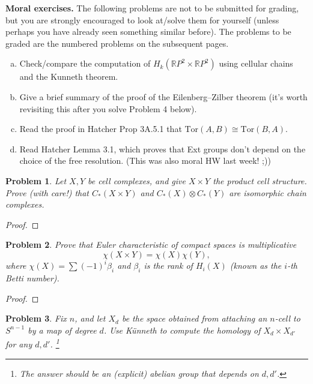 \documentclass[11pt]{article}
\newtheorem{problem}{Problem}
\begin{document}
{\bf Moral exercises.} The following problems are not to be submitted for grading, but you are strongly encouraged to look at/solve them for yourself (unless perhaps you have already seen something similar before). The problems to be graded are the numbered problems on the subsequent pages.
\begin{enumerate}[(a)]
\item Check/compare the computation of $H_k(\mathbb RP^2\times \mathbb RP^2)$ using cellular chains and the Kunneth theorem. 
\item Give a brief summary of the proof of the Eilenberg--Zilber theorem (it's worth revisiting this after you solve Problem 4 below). 
\item Read the proof in Hatcher Prop 3A.5.1 that $\text{Tor}(A,B)\cong\text{Tor}(B,A)$. 
\item Read Hatcher Lemma 3.1, which proves that Ext groups don't depend on the choice of the free resolution. (This was also moral HW last week! ;))
\end{enumerate}


\pagebreak 


\begin{problem}
Let $X,Y$ be cell complexes, and give $X\times Y$ the product cell structure. Prove (with care!) that $C_*(X\times Y)$ and $C_*(X)\otimes C_*(Y)$ are isomorphic chain complexes. 
\end{problem}

\begin{proof}

\end{proof}

\pagebreak 

\begin{problem}
Prove that Euler characteristic of compact spaces is multiplicative 
\[\chi(X\times Y)=\chi(X)\chi(Y),\] where $\chi(X)=\sum(-1)^i\beta_i$ and $\beta_i$ is the rank of $H_i(X)$ (known as the $i$-th Betti number).
\end{problem}

\begin{proof}

\end{proof}

\pagebreak 


\begin{problem}
Fix $n$, and let $X_d$ be the space obtained from attaching an $n$-cell to $S^{n-1}$ by a map of degree $d$. Use K\"unneth to compute the homology of $X_d\times X_{d'}$ for any $d,d'$. \footnote{The answer should be an (explicit) abelian group that depends on $d,d'$.} 
\end{problem}
\end{document}
